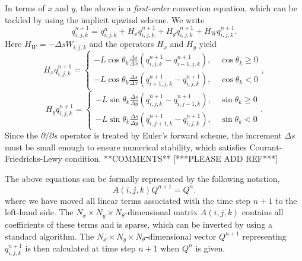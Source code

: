 \documentclass[pre,twocolumn,preprintnumbers,reprint]{revtex4}
\newcommand{\be}{\begin{equation}}
\newcommand{\en}{\end{equation}}
\begin{document}
In terms of $x$ and $y$, the above is a {\emph {first-order}} convection equation, which can be tackled by using the implicit upwind scheme. We write
\be
q_{i,j,k}^{n+1}=q_{i,j,k}^n+H_x q_{i,j,k}^{n+1}+H_yq_{i,j,k}^{n+1}+H_Wq_{i,j,k}^{n+1}.
\en
Here $H_W=-\Delta s W_{i,j,k}$ and the operators $H_x$ and $H_y$ yield
\be
H_xq_{i,j,k}^{n+1}=
\begin{cases}
-L \cos\theta_k\frac{\Delta s}{\Delta x}(q_{i,j,k}^{n+1}-q_{i-1,j,k}^{n+1}),\quad \cos\theta_k\geq0\\[3mm]
-L \cos\theta_k\frac{\Delta s}{\Delta x}(q_{i+1,j,k}^{n+1}-q_{i,j,k}^{n+1}),\quad \cos\theta_k<0
\end{cases},
\en
\be
H_yq_{i,j,k}^{n+1}=
\begin{cases}
-L \sin\theta_k\frac{\Delta s}{\Delta y}(q_{i,j,k}^{n+1}-q_{i,j-1,k}^{n+1}),\quad \sin\theta_k\geq0\\[3mm]
-L \sin\theta_k\frac{\Delta s}{\Delta y}(q_{i,j+1,k}^{n+1}-q_{i,j,k}^{n+1}),\quad \sin\theta_k<0
\end{cases}.
\en
Since the $\partial/\partial s$ operator is treated by Euler's forward scheme, the increment $\Delta s$ must be small enough to ensure numerical stability, which satisfies Courant-Friedrichs-Lewy condition\cite{Mahgerefteh2009}. **COMMENTS** [***PLEASE ADD REF***]

The above equations can be formally represented by the following notation,
\be
A(i,j,k)Q^{n+1}=Q^n.
\en
where we have moved all linear terms associated with the time step $n+1$ to the left-hand side. The $N_x\times N_y\times N_\theta$-dimensional matrix $A(i,j,k)$ contains all coefficients of these terms and is sparse, which can be inverted by using a standard algorithm. The $N_x\times N_y\times N_\theta$-dimensional vector $Q^{n+1}$ representing ${q_{i,j,k}^{n+1}}$ is then calculated at time step $n+1$ when $Q^{n}$ is given.
\end{document}
